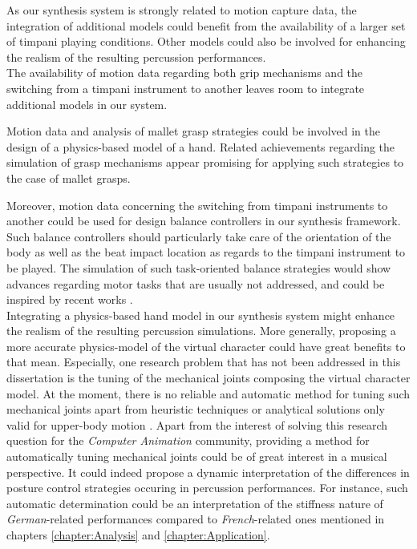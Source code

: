 As our synthesis system is strongly related to motion capture data, the integration of additional models could benefit from the availability of a larger set of timpani playing conditions. Other models could also be involved for enhancing the realism of the resulting percussion performances.\\

The availability of motion data regarding both grip mechanisms and the switching from a timpani instrument to another leaves room to integrate additional models in our system.

Motion data and analysis of mallet grasp strategies could be involved in the design of a physics-based model of a hand. Related achievements regarding the simulation of grasp mechanisms  appear promising for applying such strategies to the case of mallet grasps.

Moreover, motion data concerning the switching from timpani instruments to another could be used for design balance controllers in our synthesis framework. Such balance controllers should particularly take care of the orientation of the body as well as the beat impact location as regards to the timpani instrument to be played. The simulation of such task-oriented balance strategies would show advances regarding motor tasks that are usually not addressed, and could be inspired by recent works .\\

Integrating a physics-based hand model in our synthesis system might enhance the realism of the resulting percussion simulations. More generally, proposing a more accurate physics-model of the virtual character could have great benefits to that mean. Especially, one research problem that has not been addressed in this dissertation is the tuning of the mechanical joints composing the virtual character model. At the moment, there is no reliable and automatic method for tuning such mechanical joints apart from heuristic techniques  or analytical solutions only valid for upper-body motion . Apart from the interest of solving this research question for the \emph{Computer Animation} community, providing a method for automatically tuning mechanical joints could be of great interest in a musical perspective. It could indeed propose a dynamic interpretation of the differences in posture control strategies occuring in percussion performances. For instance, such automatic determination could be an interpretation of the stiffness nature of \emph{German}-related performances compared to \emph{French}-related ones mentioned in chapters \ref{chapter:Analysis} and \ref{chapter:Application}.

